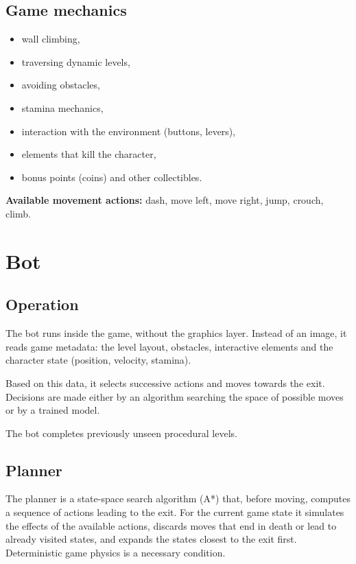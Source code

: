 \documentclass[11pt,a4paper]{article}
\begin{document}
\subsection{Game mechanics}

\begin{itemize}
  \item wall climbing,
  \item traversing dynamic levels,
  \item avoiding obstacles,
  \item stamina mechanics,
  \item interaction with the environment (buttons, levers),
  \item elements that kill the character,
  \item bonus points (coins) and other collectibles.
\end{itemize}

\textbf{Available movement actions:} dash, move left, move right, jump, crouch, climb.

\section{Bot}

\subsection{Operation}

The bot runs inside the game, without the graphics layer. Instead of an image, it reads game
metadata: the level layout, obstacles, interactive elements and the character state
(position, velocity, stamina).

Based on this data, it selects successive actions and moves towards the exit. Decisions are
made either by an algorithm searching the space of possible moves or by a trained model.

The bot completes previously unseen procedural levels.

\subsection{Planner}

The planner is a state-space search algorithm (A*) that, before moving, computes a sequence
of actions leading to the exit. For the current game state it simulates the effects of the
available actions, discards moves that end in death or lead to already visited states, and
expands the states closest to the exit first. Deterministic game physics is a necessary
condition.
\end{document}

